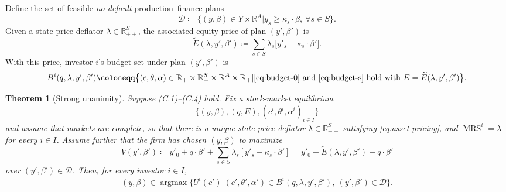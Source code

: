 \documentclass[11pt,a4paper,oneside]{book}
\def\R{\mathbb{R}}
\def\geq{\geqslant}
\DeclareMathOperator*{\argmax}{argmax}
\DeclareMathOperator{\MRS}{MRS}
\theoremstyle{plain}
\newtheorem{theorem}{Theorem}[chapter]
\theoremstyle{definition}
\theoremstyle{remark}
\numberwithin{equation}{chapter}
\begin{document}
Define the set of feasible \emph{no-default} production--finance plans
\begin{equation}\label{eq:feasible-set}
  \mathcal{D} \coloneqq \bigl\{ (y, \beta) \in Y \times \R^A \vert y_s \geq \kappa_s \cdot \beta, \ \forall s \in S \bigr\}.
\end{equation}
Given a state-price deflator $\lambda \in \R^S_{++}$, the associated equity price of plan $(y', \beta')$ is
\begin{equation}\label{eq:tilde-E}
  \widetilde{E}(\lambda, y', \beta') \coloneqq \sum_{s \in S} \lambda_s \bigl[ y'_s - \kappa_s \cdot \beta' \bigr].
\end{equation}
With this price, investor $i$'s budget set under plan $(y', \beta')$ is
\begin{equation*}
  B^i(q, \lambda, y', \beta')
  \coloneqq
  \bigl\{ (c, \theta, \alpha) \in \R_+ \times \R_+^S \times \R^A \times \R_+ \vert \text{\eqref{eq:budget-0} and \eqref{eq:budget-s} hold with } E = \widetilde{E}(\lambda, y', \beta') \bigr\}.
\end{equation*}

\begin{theorem}[Strong unanimity]\label{thm:strong-unanimity}
Suppose \textup{(C.1)--(C.4)} hold.
Fix a stock-market equilibrium
\begin{equation*}
  \bigl\{ (y, \beta), (q, E), (c^i, \theta^i, \alpha^i)_{i \in I} \bigr\}
\end{equation*}
and assume that markets are complete, so that there is a unique state-price deflator $\lambda \in \R^S_{++}$ satisfying \eqref{eq:asset-pricing}, and $\MRS^i = \lambda$ for every $i \in I$.
Assume further that the firm has chosen $(y, \beta)$ to maximize
\begin{equation*}
  V(y', \beta') \coloneqq y'_0 + q \cdot \beta' + \sum_{s \in S} \lambda_s [y'_s - \kappa_s \cdot \beta']
  = y'_0 + \widetilde{E}(\lambda, y', \beta') + q \cdot \beta'
\end{equation*}
over $(y', \beta') \in \mathcal{D}$.
Then, for every investor $i \in I$,
\begin{equation}\label{eq:strong-unanimity}
  (y, \beta) \in \argmax \bigl\{ U^i(c') \vert (c', \theta', \alpha') \in B^i(q, \lambda, y', \beta'), \ (y', \beta') \in \mathcal{D} \bigr\}.
\end{equation}
\end{theorem}
\end{document}
